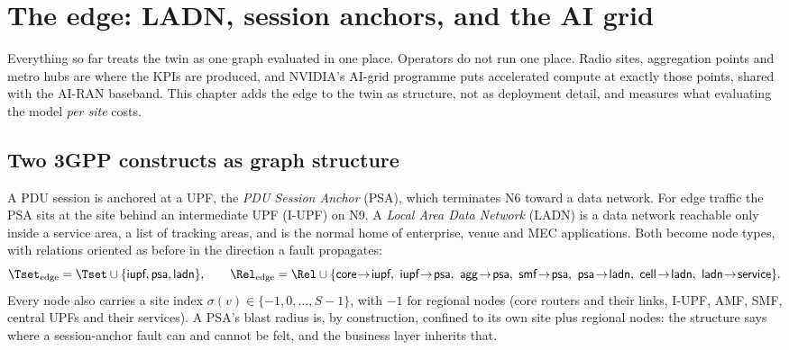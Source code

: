 \chapter{The edge: LADN, session anchors, and the AI grid}
\label{ch:edge}

Everything so far treats the twin as one graph evaluated in one place. Operators do not run one
place. Radio sites, aggregation points and metro hubs are where the KPIs are produced, and
NVIDIA's AI-grid programme puts accelerated compute at exactly those points, shared with the
AI-RAN baseband. This chapter adds the edge to the twin as structure, not as deployment detail,
and measures what evaluating the model \emph{per site} costs.

\section{Two 3GPP constructs as graph structure}
A PDU session is anchored at a UPF, the \emph{PDU Session Anchor} (PSA), which terminates N6
toward a data network. For edge traffic the PSA sits at the site behind an intermediate UPF
(I-UPF) on N9. A \emph{Local Area Data Network} (LADN) is a data network reachable only inside a
service area, a list of tracking areas, and is the normal home of enterprise, venue and MEC
applications. Both become node types, with relations oriented as before in the direction a fault
propagates:
\begin{equation}
\Tset_{\text{edge}}=\Tset\cup\{\textsf{iupf},\textsf{psa},\textsf{ladn}\},\qquad
\Rel_{\text{edge}}=\Rel\cup\{\textsf{core}\!\to\!\textsf{iupf},\ \textsf{iupf}\!\to\!\textsf{psa},\ \textsf{agg}\!\to\!\textsf{psa},\ \textsf{smf}\!\to\!\textsf{psa},\ \textsf{psa}\!\to\!\textsf{ladn},\ \textsf{cell}\!\to\!\textsf{ladn},\ \textsf{ladn}\!\to\!\textsf{service}\}.
\label{eq:edge-domain}
\end{equation}
Every node also carries a site index $\sigma(v)\in\{-1,0,\dots,S-1\}$, with $-1$ for regional
nodes (core routers and their links, I-UPF, AMF, SMF, central UPFs and their services). A PSA's
blast radius is, by construction, confined to its own site plus regional nodes: the structure
says where a session-anchor fault can and cannot be felt, and the business layer inherits that.

